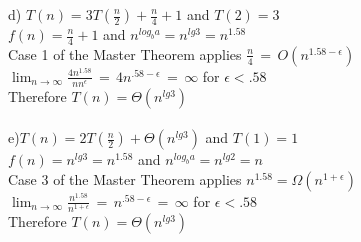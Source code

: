 \documentclass{article}
\begin{document}
d) $T(n)=3T(\frac{n}{2})+\frac{n}{4}+1$ and $T(2)=3$\\
$f(n)=\frac{n}{4}+1$ and $n^{log_ba}=n^{lg3}=n^{1.58}$\\
Case 1 of the Master Theorem applies $\frac{n}{4}\,=\,O(n^{1.58-\epsilon})$\\
$\lim_{n \to \infty}\frac{4n^{1.58}}{nn^{\epsilon}}\,=\,4n^{.58-\epsilon}\,=\,\infty$ for $\epsilon<.58$\\
Therefore $T(n)=\Theta(n^{lg3})$\\\\
e)$T(n)=2T(\frac{n}{2})+\Theta(n^{lg3})$ and $T(1)=1$\\
$f(n)=n^{lg3}=n^{1.58}$ and $n^{log_ba}=n^{lg2}=n$\\
Case 3 of the Master Theorem applies $n^{1.58}=\Omega(n^{1+\epsilon})$\\
$\lim_{n \to \infty}\frac{n^{1.58}}{n^{1+\epsilon}}\,=\,n^{.58-\epsilon}\,=\,\infty$ for $\epsilon<.58$\\
Therefore $T(n)=\Theta(n^{lg3})$
\end{document}
